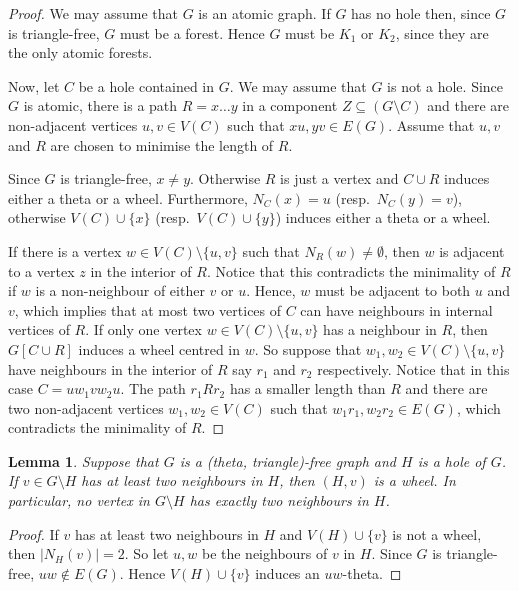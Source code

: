 \documentclass[11pt]{article}
\newtheorem{lemma}[theo]{Lemma}
\newcommand{\sm}{\setminus}
\begin{document}
\begin{proof}
 We may assume that $G$ is an atomic graph. If $G$ has no hole then, since $G$ is triangle-free, $G$ must be a forest. Hence $G$ must be $K_1$ or $K_2$, since they are the only atomic forests.

Now, let $C$ be a hole contained in $G$. We may assume that $G$ is not a hole. Since $G$ is atomic, there is a path $R=x\ldots y$ in a component $Z\subseteq (G\setminus C)$ and there are non-adjacent vertices $u,v\in V(C)$ such that $xu,yv\in E(G)$. Assume that $u,v$ and $R$ are chosen to minimise the length of $R$.

Since $G$ is triangle-free, $x\neq y$. Otherwise $R$ is just a vertex and $C\cup R$ induces either a theta or a wheel. Furthermore, $N_C(x)=u$ (resp.\ $N_C(y)=v$), otherwise $V(C)\cup\{x\}$ (resp.\ $V(C)\cup \{y\}$) induces either a theta or a wheel.

If there is a vertex $w\in V(C)\setminus\{u,v\}$ such that $N_R(w)\neq \emptyset$, then $w$ is adjacent to a vertex $z$ in the interior of $R$. Notice that this contradicts the minimality of $R$ if $w$ is a non-neighbour of either $v$ or $u$. Hence, $w$ must be adjacent to both $u$ and $v$, which implies that at most two vertices of $C$ can have neighbours in internal vertices of $R$. If only one vertex $w\in V(C)\setminus\{u,v\}$ has a neighbour in $R$, then $G[C\cup R]$ induces a wheel centred in $w$. So suppose that $w_1,w_2\in V(C)\setminus\{u,v\}$ have neighbours in the interior of $R$ say $r_1$ and $r_2$ respectively. Notice that in this case $C=uw_1vw_2u$. The path $r_1Rr_2$ has a smaller length than $R$ and there are two non-adjacent vertices $w_1,w_2\in V(C)$ such that $w_1r_1,w_2r_2\in E(G)$, which contradicts the minimality of $R$.
\end{proof}




\begin{lemma}
  \label{l:vAtachHole}
  Suppose that $G$ is a (theta, triangle)-free graph and $H$ is a hole  of $G$.  If $v \in G\sm H$ has at least two neighbours in $H$, then  $(H, v)$ is a wheel.  In particular, no vertex in $G \sm H$ has exactly two neighbours in $H$. 
\end{lemma}

\begin{proof}
If $v$ has at least two neighbours in $H$ and $V(H)\cup \{v\}$ is not a wheel, then $|N_H(v)|= 2$. So let $u,w$ be the neighbours of $v$ in $H$. Since $G$ is triangle-free, $uw\notin E(G)$. Hence $V(H)\cup\{v\}$ induces an $uw$-theta.
\end{proof}
\end{document}
